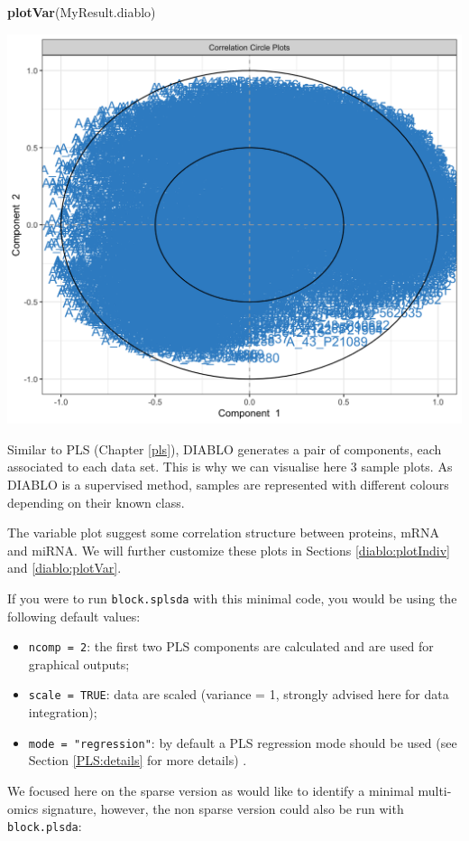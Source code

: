 \documentclass[]{book}
\newenvironment{Shaded}{\begin{snugshade}}{\end{snugshade}}
\newcommand{\KeywordTok}[1]{\textcolor[rgb]{0.13,0.29,0.53}{\textbf{#1}}}
\newcommand{\NormalTok}[1]{#1}
\providecommand{\tightlist}{%
  \setlength{\itemsep}{0pt}\setlength{\parskip}{0pt}}
\theoremstyle{definition}
\theoremstyle{definition}
\theoremstyle{definition}
\theoremstyle{remark}
\begin{document}
\begin{Shaded}
\begin{Highlighting}[]
\KeywordTok{plotVar}\NormalTok{(MyResult.diablo)}
\end{Highlighting}
\end{Shaded}

\begin{center}\includegraphics[width=0.5\linewidth]{Figures/unnamed-chunk-2-2} \end{center}

Similar to PLS (Chapter \ref{pls}), DIABLO generates a pair of
components, each associated to each data set. This is why we can
visualise here 3 sample plots. As DIABLO is a supervised method, samples
are represented with different colours depending on their known class.

The variable plot suggest some correlation structure between proteins,
mRNA and miRNA. We will further customize these plots in Sections
\ref{diablo:plotIndiv} and \ref{diablo:plotVar}.

If you were to run \texttt{block.splsda} with this minimal code, you
would be using the following default values:

\begin{itemize}
\tightlist
\item
  \texttt{ncomp\ =\ 2}: the first two PLS components are calculated and
  are used for graphical outputs;
\item
  \texttt{scale\ =\ TRUE}: data are scaled (variance = 1, strongly
  advised here for data integration);
\item
  \texttt{mode\ =\ "regression"}: by default a PLS regression mode
  should be used (see Section \ref{PLS:details} for more details) .
\end{itemize}

We focused here on the sparse version as would like to identify a
minimal multi-omics signature, however, the non sparse version could
also be run with \texttt{block.plsda}:
\end{document}
